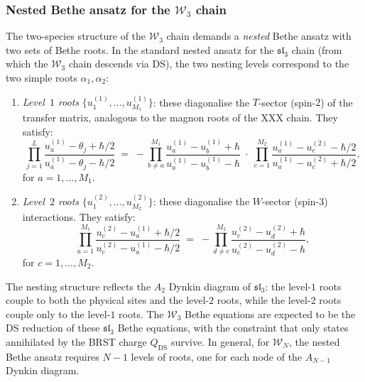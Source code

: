 \subsubsection{Nested Bethe ansatz for the $\mathcal{W}_3$ chain}

\begin{construction}
\label{constr:w3-bethe-ansatz}
%
%
The two-species structure of the $\mathcal{W}_3$ chain demands
a \emph{nested} Bethe ansatz with two sets of Bethe roots.
In the standard nested ansatz for the
$\mathfrak{sl}_3$ chain (from which the $\mathcal{W}_3$
chain descends via DS), the two nesting levels correspond to
the two simple roots $\alpha_1, \alpha_2$:
\begin{enumerate}[label=\textup{(\roman*)}]
\item \emph{Level~$1$ roots}
 $\{u_1^{(1)}, \ldots, u_{M_1}^{(1)}\}$: these diagonalise
 the $T$-sector (spin-$2$) of the transfer matrix, analogous
 to the magnon roots of the XXX chain. They satisfy:
 \begin{equation}
 \label{eq:bethe-level-1}
 \prod_{j=1}^{L}
 \frac{u_a^{(1)} - \theta_j + \hbar/2}
 {u_a^{(1)} - \theta_j - \hbar/2}
 \;=\;
 -\prod_{b \ne a}^{M_1}
 \frac{u_a^{(1)} - u_b^{(1)} + \hbar}
 {u_a^{(1)} - u_b^{(1)} - \hbar}
 \;\cdot\;
 \prod_{c=1}^{M_2}
 \frac{u_a^{(1)} - u_c^{(2)} - \hbar/2}
 {u_a^{(1)} - u_c^{(2)} + \hbar/2},
 \end{equation}
 for $a = 1, \ldots, M_1$.

\item \emph{Level~$2$ roots}
 $\{u_1^{(2)}, \ldots, u_{M_2}^{(2)}\}$: these diagonalise
 the $W$-sector (spin-$3$) interactions. They satisfy:
 \begin{equation}
 \label{eq:bethe-level-2}
 \prod_{a=1}^{M_1}
 \frac{u_c^{(2)} - u_a^{(1)} + \hbar/2}
 {u_c^{(2)} - u_a^{(1)} - \hbar/2}
 \;=\;
 -\prod_{d \ne c}^{M_2}
 \frac{u_c^{(2)} - u_d^{(2)} + \hbar}
 {u_c^{(2)} - u_d^{(2)} - \hbar},
 \end{equation}
 for $c = 1, \ldots, M_2$.
\end{enumerate}

The nesting structure reflects the $A_2$ Dynkin diagram of
$\mathfrak{sl}_3$: the level-$1$ roots couple to both the
physical sites and the level-$2$ roots, while the level-$2$
roots couple only to the level-$1$ roots. The
$\mathcal{W}_3$ Bethe equations are expected to be the
DS reduction of these $\mathfrak{sl}_3$ Bethe equations,
with the constraint that only states annihilated by the
BRST charge $Q_{\mathrm{DS}}$ survive. In general, for
$\mathcal{W}_N$, the nested Bethe ansatz requires $N - 1$
levels of roots, one for each node of the $A_{N-1}$ Dynkin
diagram.
\end{construction}

